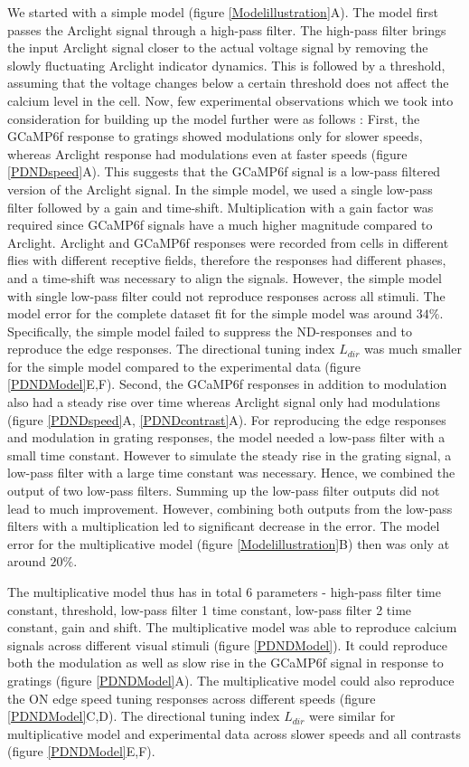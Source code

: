 \documentclass[9pt,lineno]{elife}
\begin{document}
We started with a simple model (figure \ref{Modelillustration}A). The model first passes the Arclight signal through a high-pass filter. The high-pass filter brings the input Arclight signal closer to the actual voltage signal by removing the slowly fluctuating Arclight indicator dynamics. This is followed by a threshold, assuming that the voltage changes below a certain threshold does not affect the calcium level in the cell. Now, few experimental observations which we took into consideration for building up the model further were as follows : First, the GCaMP6f response to gratings showed modulations only for slower speeds, whereas Arclight response had modulations even at faster speeds (figure \ref{PDNDspeed}A). This suggests that the GCaMP6f signal is a low-pass filtered version of the Arclight signal. In the simple model, we used a single low-pass filter followed by a gain and time-shift. Multiplication with a gain factor was required since GCaMP6f signals have a much higher magnitude compared to Arclight. Arclight and GCaMP6f responses were recorded from cells in different flies with different receptive fields, therefore the responses had different phases, and a time-shift was necessary to align the signals. However, the simple model with single low-pass filter could not reproduce responses across all stimuli. The model error for the complete dataset fit for the simple model was around $34\%$. Specifically, the simple model failed to suppress the ND-responses and to reproduce the edge responses. The directional tuning index $L_{dir}$ was much smaller for the simple model compared to the experimental data (figure \ref{PDNDModel}E,F). Second, the GCaMP6f responses in addition to modulation also had a steady rise over time whereas Arclight signal only had modulations (figure \ref{PDNDspeed}A, \ref{PDNDcontrast}A). For reproducing the edge responses and modulation in grating responses, the model needed a low-pass filter with a small time constant. However to simulate the steady rise in the grating signal, a low-pass filter with a large time constant was necessary. Hence, we combined the output of two low-pass filters. Summing up the low-pass filter outputs did not lead to much improvement. However, combining both outputs from the low-pass filters with a multiplication led to significant decrease in the error. The model error for the multiplicative model (figure \ref{Modelillustration}B) then was only at around $20\%$. 

The multiplicative model thus has in total 6 parameters - high-pass filter time constant, threshold, low-pass filter 1 time constant, low-pass filter 2 time constant, gain and shift.  The multiplicative model was able to reproduce calcium signals across different visual stimuli (figure \ref{PDNDModel}). It could reproduce both the modulation as well as slow rise in the GCaMP6f signal in response to gratings (figure \ref{PDNDModel}A). The multiplicative model could also reproduce the ON edge speed tuning responses across different speeds (figure \ref{PDNDModel}C,D). The directional tuning index $L_{dir}$ were similar for multiplicative model and experimental data across slower speeds and all contrasts (figure \ref{PDNDModel}E,F).   
\end{document}
